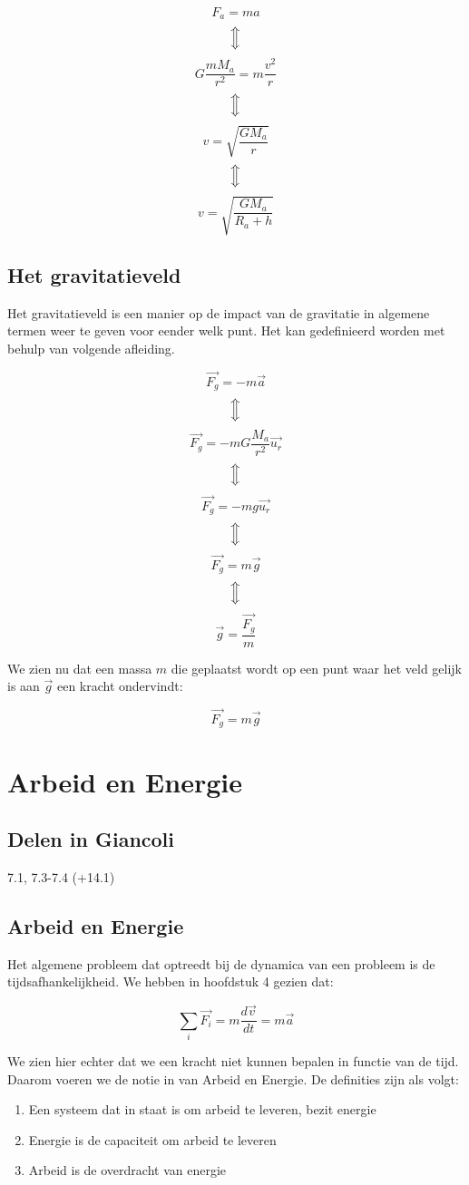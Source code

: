 \documentclass[12pt,a4paper]{article}
\newcommand{\Luda}{\Big\Updownarrow}
\begin{document}
    $$ F_{a} = ma $$
    $$\Luda$$
    $$ G\frac{mM_{a}}{r^{2}} = m\frac{v^{2}}{r} $$ 
    $$\Luda$$
    $$ v = \sqrt{\frac{GM_{a}}{r}}$$
    $$\Luda$$
    $$ v = \sqrt{\frac{GM_{a}}{R_{a} + h}} $$
    
    \subsection{Het gravitatieveld}
    Het gravitatieveld is een manier op de impact van de gravitatie in algemene termen weer te geven voor eender welk punt. Het kan gedefinieerd worden met behulp
    van volgende afleiding.
    
    $$ \vec{F_{g}} = -m\vec{a}$$
    $$\Luda$$
    $$ \vec{F_{g}} = -mG\frac{M_{a}}{r^{2}}\vec{u_{r}}$$
    $$\Luda$$
    $$ \vec{F_{g}} = -mg\vec{u_{r}}$$
    $$\Luda$$
    $$ \vec{F_{g}} = m\vec{g}$$
    $$\Luda$$
    $$ \vec{g} = \frac{\vec{F_{g}}}{m}$$
    
    We zien nu dat een massa $m$ die geplaatst wordt op een punt waar het veld gelijk is aan $\vec{g}$ een kracht ondervindt:
    
    $$ \vec{F_{g}} = m\vec{g}$$ 

    \section{Arbeid en Energie}

    \subsection{Delen in Giancoli}
    7.1, 7.3-7.4 (+14.1)

    \subsection{Arbeid en Energie}
    Het algemene probleem dat optreedt bij de dynamica van een probleem is de tijdsafhankelijkheid.
    We hebben in hoofdstuk 4 gezien dat:
    
    $$ \sum_{i} \vec{F_{i}} = m\frac{d\vec{v}}{dt} = m\vec{a} $$
    
    We zien hier echter dat we een kracht niet kunnen bepalen in functie van de tijd. Daarom voeren
    we de notie in van Arbeid en Energie. De definities zijn als volgt:
    
    \begin{enumerate}
    	\item Een systeem dat in staat is om arbeid te leveren, bezit energie
    	\item Energie is de capaciteit om arbeid te leveren
    	\item Arbeid is de overdracht van energie
    \end{enumerate}
    
\end{document}
